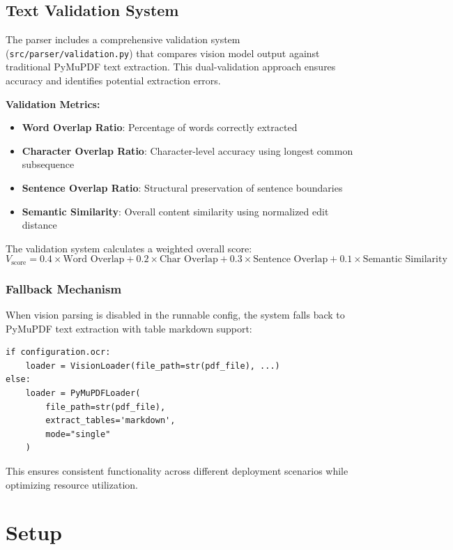 \documentclass[11pt,a4paper]{report}
\begin{document}
\section{Text Validation System}

The parser includes a comprehensive validation system (\texttt{src/parser/validation.py}) that compares vision model output against traditional PyMuPDF text extraction. This dual-validation approach ensures accuracy and identifies potential extraction errors.

\textbf{Validation Metrics:}
\begin{itemize}
    \item \textbf{Word Overlap Ratio}: Percentage of words correctly extracted
    \item \textbf{Character Overlap Ratio}: Character-level accuracy using longest common subsequence
    \item \textbf{Sentence Overlap Ratio}: Structural preservation of sentence boundaries
    \item \textbf{Semantic Similarity}: Overall content similarity using normalized edit distance
\end{itemize}

The validation system calculates a weighted overall score:
\begin{equation}
V_{\text{score}} = 0.4 \times \text{Word Overlap} + 0.2 \times \text{Char Overlap} + 0.3 \times \text{Sentence Overlap} + 0.1 \times \text{Semantic Similarity}
\end{equation}

\subsection{Fallback Mechanism}

When vision parsing is disabled in the runnable config, the system falls back to PyMuPDF text extraction with table markdown support:

\begin{lstlisting}[caption={Parser fallback mechanism}]
if configuration.ocr:
    loader = VisionLoader(file_path=str(pdf_file), ...)
else:
    loader = PyMuPDFLoader(
        file_path=str(pdf_file),
        extract_tables='markdown',
        mode="single"
    )
\end{lstlisting}

This ensures consistent functionality across different deployment scenarios while optimizing resource utilization.

\chapter{Setup}
\end{document}
